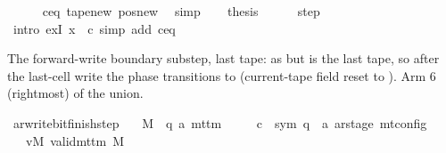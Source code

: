 \begin{isabellebody}
\ \ \ \ \isamarkupfalse%
\ c{\isacharprime}{\kern0pt}{\isacharunderscore}{\kern0pt}eq\ tape{\isacharunderscore}{\kern0pt}new\ pos{\isacharunderscore}{\kern0pt}new\ \isamarkupfalse%
\ simp\isanewline
\ \ \isamarkupfalse%
\ {\isacharquery}{\kern0pt}thesis\isanewline
\ \ \ \ \isamarkupfalse%
\ step\ \isamarkupfalse%
\ {\isacharparenleft}{\kern0pt}intro\ exI{\isacharbrackleft}{\kern0pt}\ x\ {\isacharequal}{\kern0pt}\ {\isacharquery}{\kern0pt}c{\isacharprime}{\kern0pt}{\isacharprime}{\kern0pt}{\isacharbrackright}{\kern0pt}{\isacharparenright}{\kern0pt}\ {\isacharparenleft}{\kern0pt}simp\ add{\isacharcolon}{\kern0pt}\ c{\isacharprime}{\kern0pt}{\isacharunderscore}{\kern0pt}eq{\isacharparenright}{\kern0pt}\isanewline
{}\isamarkupfalse%
%
\endisatagproof
{\isafoldproof}%
%
\isadelimproof
%
\endisadelimproof
%
\begin{isamarkuptext}%
The forward-write boundary substep, last tape: as
   but  is the last tape, so
  after the last-cell write the phase transitions to 
  (current-tape field reset to ).  Arm 6 (rightmost) of
  the union.%
\end{isamarkuptext}\isamarkuptrue%
\isamarkupfalse%
\ ar{\isacharunderscore}{\kern0pt}write{\isacharunderscore}{\kern0pt}bit{\isacharunderscore}{\kern0pt}finish{\isacharunderscore}{\kern0pt}step{\isacharcolon}{\kern0pt}\isanewline
\ \ \ M\ {\isacharcolon}{\kern0pt}{\isacharcolon}{\kern0pt}\ {\isachardoublequoteopen}{\isacharparenleft}{\kern0pt}{\isacharprime}{\kern0pt}q{\isacharcomma}{\kern0pt}\ {\isacharprime}{\kern0pt}a{\isacharparenright}{\kern0pt}\ mttm{\isachardoublequoteclose}\isanewline
\ \ \ \ \ c{\isacharprime}{\kern0pt}\ {\isacharcolon}{\kern0pt}{\isacharcolon}{\kern0pt}\ {\isachardoublequoteopen}{\isacharparenleft}{\kern0pt}sym{}{\isacharcomma}{\kern0pt}\ {\isacharprime}{\kern0pt}q\ {\isasymtimes}\ {\isacharprime}{\kern0pt}a\ ar{\isacharunderscore}{\kern0pt}stage{\isacharparenright}{\kern0pt}\ mt{\isacharunderscore}{\kern0pt}config{\isachardoublequoteclose}\isanewline
\ \ \ vM{\isacharcolon}{\kern0pt}\ {\isachardoublequoteopen}valid{\isacharunderscore}{\kern0pt}mttm\ M{\isachardoublequoteclose}\isanewline

\end{isabellebody}
